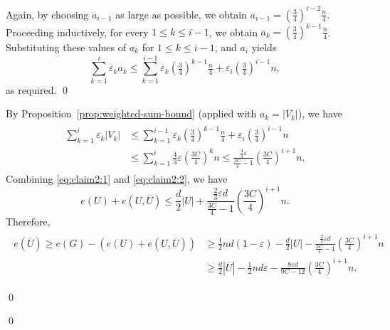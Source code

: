 \documentclass[10pt]{article}
\theoremstyle{plain}
\numberwithin{theorem}{section}
\theoremstyle{definition}
\theoremstyle{remark}
\renewenvironment{proof}[1][]{\begin{trivlist}
\item[\hspace{\labelsep}{\bf\noindent Proof#1.\/}] }{\qed\end{trivlist}}
\newcommand{\eps}{\varepsilon}
\theoremstyle{plain}
\begin{document}
\begin{proof}[ of \Cref{lem:expandercoverweak}]
\begin{proof}[ of claim]
\begin{proof}
Again, by choosing $a_{i-1}$ as large as possible, we obtain $a_{i-1} =(\tfrac34)^{i-2}\tfrac n4$. Proceeding inductively, for every $1\le k\le i-1$, we obtain
$a_k = (\tfrac34)^{k-1}\tfrac n4$.
Substituting these values of $a_k$ for $1 \le k \le i-1$, and $a_i$ yields
\[
\sum_{k=1}^i \eps_k a_k
\le
\sum_{k=1}^{i-1}
\eps_k(\tfrac34)^{k-1}\tfrac n4
+\eps_i(\tfrac34)^{i-1}n ,
\]
as required.
\end{proof}
By Proposition~\ref{prop:weighted-sum-bound} (applied with $a_k=|V_k|$), we have
		\begin{align}
			\label{eq:claim2:2}
			\begin{split}
				\sum_{k=1}^i \eps_k|V_k| 
				& \le \sum_{k=1}^{i-1} \eps_k \left(\frac{3}{4}\right)^{k-1} \frac{n}{4} + \eps_i \left(\frac{3}{4}\right)^{i-1} n  \\
				& \le \sum_{k=1}^{i} \frac{4}{3} \eps \left(\frac{3 C}{4}\right)^{k} n 
				\le \frac{\frac{4}{3} \eps}{\frac{3 C}{4}-1} \left(\frac{3 C}{4}\right)^{i+1}n.
			\end{split}
		\end{align}
		Combining \eqref{eq:claim2:1} and \eqref{eq:claim2:2}, we have $$e(U) + e(U, \overline{U}) \le \frac{d}{2} |U| + \frac{\frac{2}{3} \eps d}{\frac{3 C}{4}-1} \left(\frac{3 C}{4}\right)^{i+1}n.$$
		Therefore, 
		\begin{align} \label{claim2:eq3}
			\begin{split}
				e(\overline{U}) \ge e(G) - (e(U) + e(U, \overline{U})) 
				&\ge \frac{1}{2} nd(1-\eps) - \frac{d}{2} |U| - \frac{\frac{2}{3} \eps d}{\frac{3 C}{4}-1} \left(\frac{3 C}{4}\right)^{i+1}n \\  
				&\ge \frac{d}{2} |\overline{U}| - \frac{1}{2} n d \eps - \frac{8\eps d}{9C - 12} \left(\frac{3 C}{4}\right)^{i+1}n. 
			\end{split}
		\end{align}


\end{proof}
\end{proof}
\end{document}
